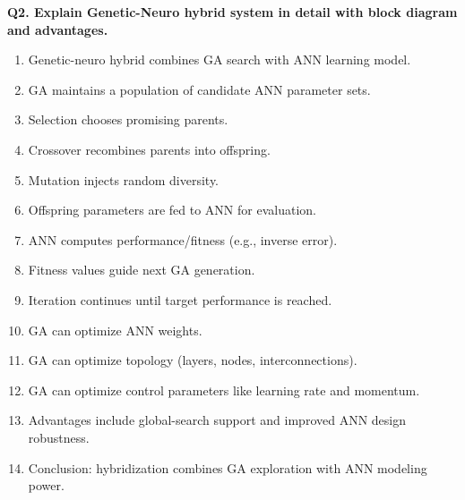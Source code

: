 \documentclass[11pt,a4paper]{article}
\begin{document}
\textbf{Q2. Explain Genetic-Neuro hybrid system in detail with block diagram and advantages.}
\begin{enumerate}
\item Genetic-neuro hybrid combines GA search with ANN learning model.
\item GA maintains a population of candidate ANN parameter sets.
\item Selection chooses promising parents.
\item Crossover recombines parents into offspring.
\item Mutation injects random diversity.
\item Offspring parameters are fed to ANN for evaluation.
\item ANN computes performance/fitness (e.g., inverse error).
\item Fitness values guide next GA generation.
\item Iteration continues until target performance is reached.
\item GA can optimize ANN weights.
\item GA can optimize topology (layers, nodes, interconnections).
\item GA can optimize control parameters like learning rate and momentum.
\item Advantages include global-search support and improved ANN design robustness.
\item Conclusion: hybridization combines GA exploration with ANN modeling power.
\end{enumerate}
\end{document}
